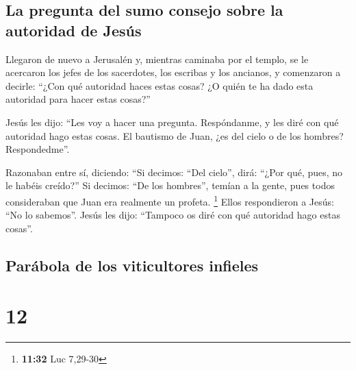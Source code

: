 \hypertarget{la-pregunta-del-sumo-consejo-sobre-la-autoridad-de-jesuxfas}{%
\subsection{La pregunta del sumo consejo sobre la autoridad de
Jesús}\label{la-pregunta-del-sumo-consejo-sobre-la-autoridad-de-jesuxfas}}

 Llegaron de nuevo a Jerusalén y, mientras caminaba por
el templo, se le acercaron los jefes de los sacerdotes, los escribas y
los ancianos,  y comenzaron a decirle: ``¿Con qué
autoridad haces estas cosas? ¿O quién te ha dado esta autoridad para
hacer estas cosas?''

 Jesús les dijo: ``Les voy a hacer una pregunta.
Respóndanme, y les diré con qué autoridad hago estas cosas.
 El bautismo de Juan, ¿es del cielo o de los hombres?
Respondedme''.

 Razonaban entre sí, diciendo: ``Si decimos: ``Del
cielo'', dirá: ``¿Por qué, pues, no le habéis creído?'' 
Si decimos: ``De los hombres'', temían a la gente, pues todos
consideraban que Juan era realmente un profeta. \footnote{\textbf{11:32}
  Luc 7,29-30}  Ellos respondieron a Jesús: ``No lo
sabemos''. Jesús les dijo: ``Tampoco os diré con qué autoridad hago
estas cosas''.

\hypertarget{paruxe1bola-de-los-viticultores-infieles}{%
\subsection{Parábola de los viticultores
infieles}\label{paruxe1bola-de-los-viticultores-infieles}}

\hypertarget{section-11}{%
\section{12}\label{section-11}}

